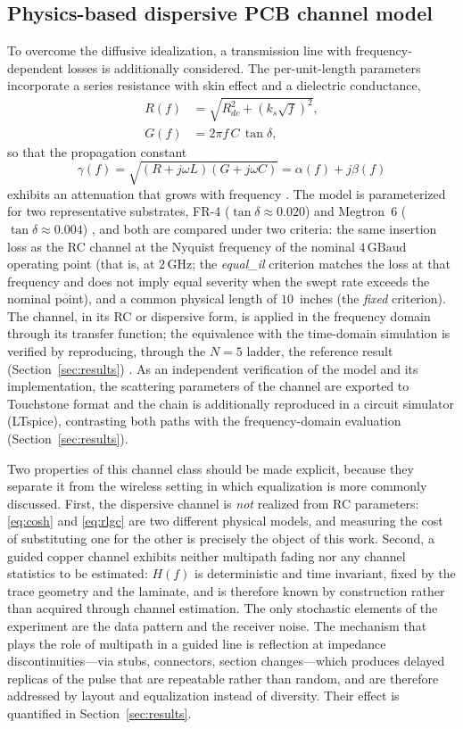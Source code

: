 \documentclass[twocolumn]{USG}
\begin{document}
\subsection{Physics-based dispersive PCB channel model}
\label{sec:canalfisico}
To overcome the diffusive idealization, a transmission line with
frequency-dependent losses is additionally considered. The per-unit-length
parameters incorporate a series resistance with skin effect and a
dielectric conductance,
\begin{equation}
\begin{aligned}
R(f)&=\sqrt{R_{dc}^2+\left(k_s\sqrt{f}\right)^2},\\
G(f)&=2\pi f\,C\,\tan\delta,
\end{aligned}
\label{eq:rlgc}
\end{equation}
so that the propagation constant
\[
\gamma(f)=\sqrt{(R+j\omega L)(G+j\omega C)}=\alpha(f)+j\beta(f)
\]
exhibits an
attenuation that grows with frequency \cite{9888577,8861405}. The model is
parameterized for two representative substrates, FR-4
($\tan\delta\approx0.020$) and Megtron~6 ($\tan\delta\approx0.004$)
\cite{9785524,10385078}, and both are compared under two criteria: the same
insertion loss as the RC channel at the Nyquist frequency of the nominal
$4\,\mathrm{GBaud}$ operating point (that is, at $2\,\mathrm{GHz}$; the
\textit{equal\_il} criterion matches the loss at that frequency and does not
imply equal severity when the swept rate exceeds the nominal point), and a
common physical length of $10$~inches (the \textit{fixed} criterion). The
channel, in its RC or dispersive form, is applied in the frequency domain
through its transfer function; the equivalence with the time-domain
simulation is verified by reproducing, through the $N=5$ ladder, the
reference result (Section~\ref{sec:results}) \cite{7445206}. As an
independent verification of the model and its implementation, the scattering
parameters of the channel are exported to Touchstone format and the chain is
additionally reproduced in a circuit simulator (LTspice), contrasting both
paths with the frequency-domain evaluation (Section~\ref{sec:results}).

Two properties of this channel class should be made explicit, because they
separate it from the wireless setting in which equalization is more commonly
discussed. First, the dispersive channel is \emph{not} realized from RC
parameters: \eqref{eq:cosh} and \eqref{eq:rlgc} are two different physical
models, and measuring the cost of substituting one for the other is precisely
the object of this work. Second, a guided copper channel exhibits neither
multipath fading nor any channel statistics to be estimated: $H(f)$ is
deterministic and time invariant, fixed by the trace geometry and the laminate,
and is therefore known by construction rather than acquired through channel
estimation. The only stochastic elements of the experiment are the data pattern
and the receiver noise. The mechanism that plays the role of multipath in a
guided line is reflection at impedance discontinuities---via stubs, connectors,
section changes---which produces delayed replicas of the pulse that are
repeatable rather than random, and are therefore addressed by layout and
equalization instead of diversity. Their effect is quantified in
Section~\ref{sec:results}.
\end{document}
